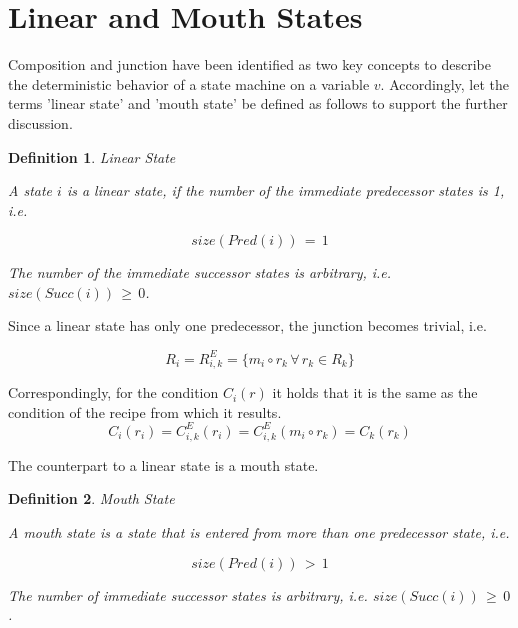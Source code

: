 \documentclass[12pt,a4paper]{scrartcl}
\newtheorem{definition}{Definition}
\begin{document}
\section{Linear and Mouth States}

Composition and junction have been identified as two key concepts to describe
the deterministic behavior of a state machine on a variable $v$. Accordingly,
let the terms 'linear state' and 'mouth state' be defined as follows to support
the further discussion. 

\begin{definition} Linear State

    A state $i$ is a linear state, if the number of the immediate predecessor 
    states is 1, i.e. 

    \begin{equation}
                size(Pred(i))\,=\,1
    \end{equation}

    The number of the immediate successor states is arbitrary, i.e.
    $size(Succ(i))\,\ge\,0$.

\end{definition}

Since a linear state has only one predecessor, the junction becomes trivial, i.e.

\begin{equation} \label{eq:composition-complete-recipe}
    R_i      = R^E_{i,k}      = \{ m_i\circ r_k \,\forall\, r_k\in R_k \}
\end{equation}

Correspondingly, for the condition $C_i(r)$ it holds that it is the same as the
condition of the recipe from which it results.
\begin{equation} \label{eq:composition-complete-condition}
    C_i(r_i) = C^E_{i,k}(r_i) = C^E_{i,k}(m_i\circ r_k) = C_k(r_k)
\end{equation}

The counterpart to a linear state is a mouth state.

\begin{definition} Mouth State

    A mouth state is a state that is entered from more than one predecessor
    state, i.e.

    \begin{equation}
                               size(Pred(i))\,>\,1
    \end{equation}

    The number of immediate successor states is arbitrary, i.e.
    $size(Succ(i))\,\ge\,0$.

\end{definition}
\end{document}
